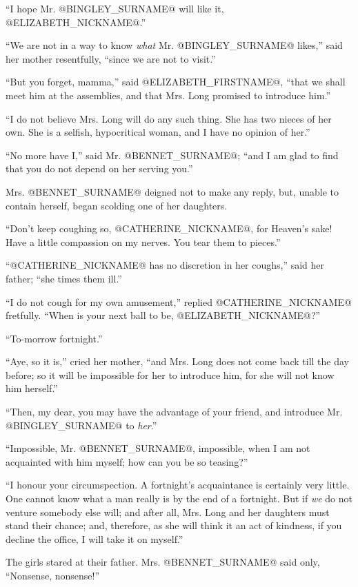 ``I hope Mr. @BINGLEY_SURNAME@ will like it, @ELIZABETH_NICKNAME@.''

``We are not in a way to know \textit{what} Mr. @BINGLEY_SURNAME@ likes,'' said her mother
resentfully, ``since we are not to visit.''

``But you forget, mamma,'' said @ELIZABETH_FIRSTNAME@, ``that we shall meet him at the
assemblies, and that Mrs. Long promised to introduce him.''

``I do not believe Mrs. Long will do any such thing. She has two nieces
of her own. She is a selfish, hypocritical woman, and I have no opinion
of her.''

``No more have I,'' said Mr. @BENNET_SURNAME@; ``and I am glad to find that you do
not depend on her serving you.''

Mrs. @BENNET_SURNAME@ deigned not to make any reply, but, unable to contain
herself, began scolding one of her daughters.

``Don't keep coughing so, @CATHERINE_NICKNAME@, for Heaven's sake! Have a little
compassion on my nerves. You tear them to pieces.''

``@CATHERINE_NICKNAME@ has no discretion in her coughs,'' said her father; ``she times
them ill.''

``I do not cough for my own amusement,'' replied @CATHERINE_NICKNAME@ fretfully. ``When is
your next ball to be, @ELIZABETH_NICKNAME@?''

``To-morrow fortnight.''

``Aye, so it is,'' cried her mother, ``and Mrs. Long does not come back
till the day before; so it will be impossible for her to introduce him,
for she will not know him herself.''

``Then, my dear, you may have the advantage of your friend, and introduce
Mr. @BINGLEY_SURNAME@ to \textit{her}.''

``Impossible, Mr. @BENNET_SURNAME@, impossible, when I am not acquainted with him
myself; how can you be so teasing?''

``I honour your circumspection. A fortnight's acquaintance is certainly
very little. One cannot know what a man really is by the end of a
fortnight. But if \textit{we} do not venture somebody else will; and after all,
Mrs. Long and her daughters must stand their chance; and, therefore, as
she will think it an act of kindness, if you decline the office, I will
take it on myself.''

The girls stared at their father. Mrs. @BENNET_SURNAME@ said only, ``Nonsense,
nonsense!''

